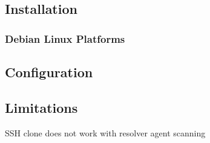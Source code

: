 \subsection{Installation}

\subsubsection{Debian Linux Platforms}

\subsection{Configuration}



\subsection{Limitations}
SSH clone does not work with resolver agent scanning
